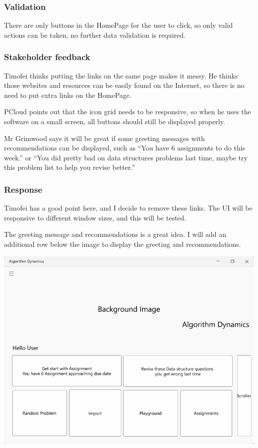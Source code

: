 \documentclass[a4paper]{report}
\begin{document}
\subsubsection{Validation}

There are only buttons in the HomePage for the user to click, so only valid actions can be taken, no further data validation is required.

\subsubsection{Stakeholder feedback}
\label{subsubsec:homepage stakeholder feedback}

Timofei thinks putting the links on the same page makes it messy. He thinks those websites and resources can be easily found on the Internet, so there is no need to put extra links on the HomePage.

PCloud points out that the icon grid needs to be responsive, so when he uses the software on a small screen, all buttons should still be displayed properly.

Mr Grimwood says it will be great if some greeting messages with recommendations can be displayed, such as ``You have 6 assignments to do this week.'' or ``You did pretty bad on data structures problems last time, maybe try this problem list to help you revise better.''

\subsubsection{Response}

Timofei has a good point here, and I decide to remove these links. The UI will be responsive to different window sizes, and this will be tested.

The greeting message and recommendations is a great idea. I will add an additional row below the image to display the greeting and recommendations.

\includegraphics[width=\textwidth, height=\textheight, keepaspectratio]{HomePage-Updated-design}
\end{document}
